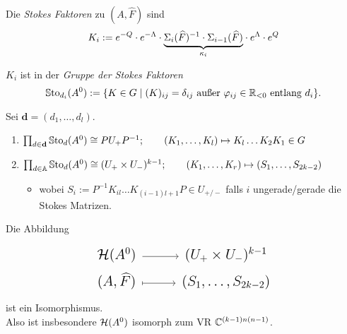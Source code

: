 \begin{defn}
  Die \emph{Stokes Faktoren} zu $(A,\hat F)$ sind
  \[
    K_i:= e^{-Q}\cdot e^{-\Lambda} \cdot \underset{\kappa_i}{\underbrace{%
      \Sigma_i(\hat F)^{-1}\cdot \Sigma_{i-1}(\hat F)}}
    \cdot  e^{\Lambda}\cdot e^{Q}
  \]
  \begin{lem}
    $K_i$ ist in der \emph{Gruppe der Stokes Faktoren}
    \[
      \operatorname{\mathbb{S}to}_{d_i}(A^0) := \{K \in G \mid (K)_{ij}
      =\delta_{ij} \text{ außer } \varphi_{ij}\in\mathbb{R}_{<0}\text{ entlang } d_i \}.
    \]
  \end{lem}
\end{defn}
\begin{lem}
  Sei $\textbf{d}=(d_1,\dots,d_l)$.
  \begin{enumerate}
    \item $\prod_{d\in\textbf{d}}\operatorname{\mathbb{S}to}_d(A^0)\cong PU_+P^{-1};
      \qquad
      (K_1,\dots,K_l)\mapsto K_l\dots K_2K_1\in G$
    \item $\prod_{d\in\mathbb{A}}\operatorname{\mathbb{S}to}_d(A^0)\cong (U_+\times U_-)^{k-1};
      \qquad
      (K_1,\dots,K_r)\mapsto (S_1,\dots,S_{2k-2})$
      \begin{itemize}
        \item wobei $S_i:=P^{-1}K_{il}\dots K_{(i-1)l+1}P\in U_{+/-}$ falls $i$
          ungerade/gerade die Stokes Matrizen.
      \end{itemize}
  \end{enumerate}
\end{lem}

\begin{thm}
  Die Abbildung
  \[ \Large\begin{tikzcd}[row sep=0em]
      \cH(A^0) \rar & (U_+\times U_-)^{k-1}
    \\(A,\hat F) \rar[mapsto] & (S_1,\dots,S_{2k-2})
  \end{tikzcd} \]
  ist ein Isomorphismus.
  \\Also ist insbesondere $\mathcal{H}(A^0)$ isomorph zum VR $\mathbb{C}^{(k-1)n(n-1)}$.
\end{thm}

